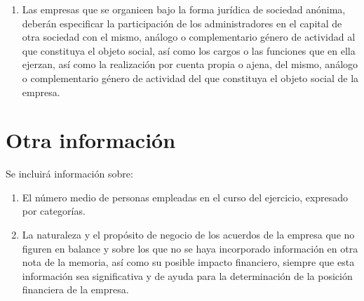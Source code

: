 \documentclass[11pt,a4paper]{article}
\begin{document}
\begin{enumerate}
\item Las empresas que se organicen bajo la forma jurídica de sociedad anónima, deberán especificar la participación de los administradores en el capital de otra sociedad con el mismo, análogo o complementario género de actividad al que constituya el objeto social, así como los cargos o las funciones que en ella ejerzan, así como la realización por cuenta propia o ajena, del mismo, análogo o complementario género de actividad del que constituya el objeto social de la empresa.
\end{enumerate}

\section{Otra información}
Se incluirá información sobre:
\begin{enumerate}
 \item El número medio de personas empleadas en el curso del ejercicio, expresado por categorías.
 \item La naturaleza y el propósito de negocio de los acuerdos de la empresa que no figuren en balance y sobre los que no se haya incorporado información en otra nota de la memoria, así como su posible impacto financiero, siempre que esta información sea significativa y de ayuda para la determinación de la posición financiera de la empresa.
\end{enumerate}

\end{document}
